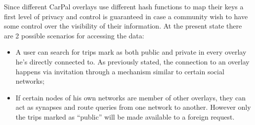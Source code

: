 %
Since different CarPal overlays use different hash functions to map
their keys a first level of privacy and control is guaranteed in case
a community wish to have some control over the visibility of their
information. At the present state there are 2 possible scenarios for
accessing the data:
%
\begin{itemize}
\item A user can search for trips mark as both public and private in
  every overlay he's directly connected to. As previously stated, the
  connection to an overlay happens via invitation through a mechanism
  similar to certain social networks;
\item If certain nodes of his own networks are member of other
  overlays, they can act as synapses and route queries from one
  network to another. However only the trips marked as ``public'' will
  be made available to a foreign request.
\end{itemize}
